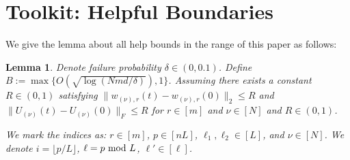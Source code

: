 \documentclass[11pt]{article}
\theoremstyle{plain}
\newtheorem{lemma}[theorem]{Lemma}
\begin{document}
\newpage%
\section{Toolkit: Helpful Boundaries}\label{app:concentrations}

We give the lemma about all help bounds in the range of this paper as follows:
\begin{lemma}\label{lem:helpful_bounds}
    Denote failure probability $\delta \in (0, 0.1)$. Define $B := \max\{O(\sqrt{\log(Nmd/\delta)}), 1\}$. Assuming there exists a constant $R \in (0, 1)$ satisfying $\| w_{(\nu), r}(t) - w_{(\nu), r}(0) \|_2 \leq R$ and $\| U_{(\nu)}(t) - U_{(\nu)}(0)\|_F \leq R$ for $r \in [m]$ and $\nu \in [N]$ and $R \in (0, 1)$.

    We mark the indices as: $r\in [m]$, $p \in [nL]$, $\ell_1, \ell_2 \in [L]$, and $\nu \in [N]$. We denote $i = \lfloor p / L \rfloor$, $\ell = p {\rm ~ mod~} L$, $\ell' \in [\ell]$.
    

\end{lemma}
\end{document}
